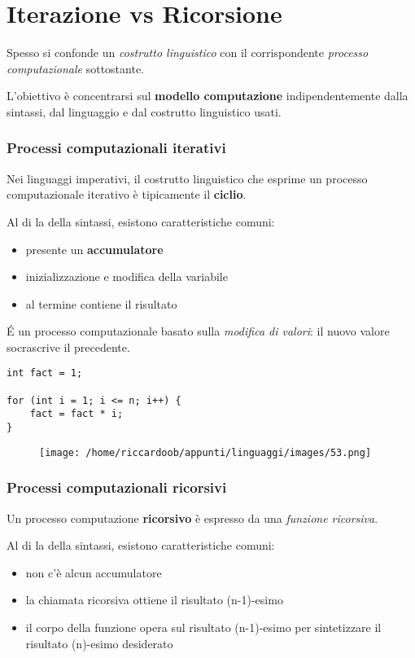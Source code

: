 \chapter{Iterazione vs Ricorsione}

Spesso si confonde un \textit{costrutto linguistico} con il corrispondente \textit{processo computazionale} sottostante.

L'obiettivo è concentrarsi sul \textbf{modello computazione} indipendentemente dalla sintassi, dal linguaggio e dal costrutto linguistico usati.

\subsection{Processi computazionali iterativi}
Nei linguaggi imperativi, il costrutto linguistico che esprime un processo computazionale iterativo è tipicamente il \textbf{ciclio}.

Al di la della sintassi, esistono caratteristiche comuni:
\begin{itemize}
    \item presente un \textbf{accumulatore}
    \item inizializzazione e modifica della variabile
    \item al termine contiene il risultato
\end{itemize}

É un processo computazionale basato sulla \textit{modifica di valori}: il nuovo valore socrascrive il precedente.

\begin{verbatim}
int fact = 1;

for (int i = 1; i <= n; i++) {
    fact = fact * i;
}
\end{verbatim}
\begin{figure}[H]
    \centering
    \texttt{[image: /home/riccardoob/appunti/linguaggi/images/53.png]}
\end{figure}

\subsection{Processi computazionali ricorsivi}
Un processo computazione \textbf{ricorsivo} è espresso da una \textit{funzione ricorsiva}.

Al di la della sintassi, esistono caratteristiche comuni:
\begin{itemize}
    \item non c'è alcun accumulatore
    \item la chiamata ricorsiva ottiene il risultato (n-1)-esimo
    \item il corpo della funzione opera sul risultato (n-1)-esimo per sintetizzare il risultato (n)-esimo desiderato
\end{itemize}

